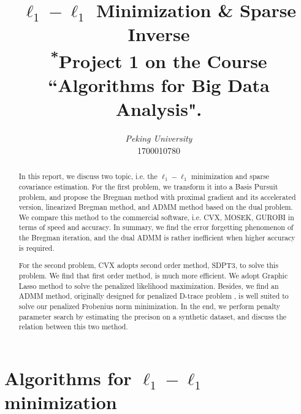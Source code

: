 \documentclass[conference,onecolumn,12pt]{IEEEtran}
\newcommand{\<}{\langle}
\renewcommand{\>}{\rangle}
\numberwithin{equation}{section}
\begin{document}
    \title{$\ell_1-\ell_1$ Minimization \& Sparse Inverse\\
    {\footnotesize \textsuperscript{*}Project 1 on the Course ``Algorithms for Big Data Analysis".}
    }
    
    \author{
    \textit{Peking University}\\
    1700010780}
    
    \maketitle
    \thispagestyle{fancy} %
    \lhead{} %
    \chead{} %
    \rhead{} %
    \lfoot{} %
    \cfoot{} %
    \cfoot{\thepage} %
    \renewcommand{\headrulewidth}{0pt} %
    \renewcommand{\footrulewidth}{1pt} %
    \pagestyle{fancy}
    \cfoot{\thepage}
    \begin{abstract}
        In this report, we discuss two topic, i.e. the $\ell_1-\ell_1$ minimization and sparse covariance estimation. For the first problem, we transform it into a Basis Pursuit problem, and propose the Bregman method with proximal gradient and its accelerated version, linearized Bregman method, and ADMM method based on the dual problem. We compare this method to the commercial software, i.e. CVX, MOSEK, GUROBI in terms of speed and accuracy. In summary, we find the error forgetting phenomenon \cite{yin2013error} of the Bregman iteration, and the dual ADMM is rather inefficient when higher accuracy is required.

        For the second problem, CVX adopts second order method, SDPT3, to solve this problem. We find that first order method, is much more efficient. We adopt Graphic Lasso method to solve the penalized likelihood maximization. Besides, we find an ADMM method, originally designed for penalized D-trace problem \cite{zhang2014sparse}, is well suited to solve our penalized Frobenius norm minimization. In the end, we perform penalty parameter search by estimating the precison on a synthetic dataset, and discuss the relation between this two method. 
    \end{abstract}
    \tableofcontents
\clearpage
\section{Algorithms for $\ell_1-\ell_1$ minimization}
\end{document}
